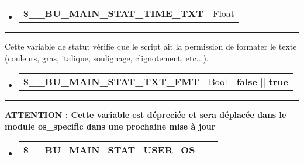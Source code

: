 \documentclass[a4paper,10pt]{article}
\begin{document}
\begin{justify}
     \begin{itemize}
        \item
        {
            \begin{tabular}{l|l}
                \textbf{\color{orange}\$\_\_BU\_MAIN\_STAT\_TIME\_TXT}  & Float\\[1\baselineskip]
            \end{tabular}
        }
    \end{itemize}
\end{justify}


\par\noindent\rule{\textwidth}{0.4pt}

\begin{justify}
    Cette variable de statut vérifie que le script ait la permission de formater le texte (couleurs, gras, italique, soulignage, clignotement, etc...).
\end{justify}

\begin{justify}
     \begin{itemize}
        \item
        {
            \begin{tabular}{l|l|l}
                \textbf{\color{orange}\$\_\_BU\_MAIN\_STAT\_TXT\_FMT}   & Bool & \textbf{false} || \textbf{true}\\[1\baselineskip]
            \end{tabular}
        }
    \end{itemize}
\end{justify}


\par\noindent\rule{\textwidth}{0.4pt}

\begin{justify}
\textbf{ATTENTION : Cette variable est dépreciée et sera déplacée dans le module \textbf{\color{lime}os\_specific} dans une prochaine mise à jour}
\end{justify}

\begin{justify}
     \begin{itemize}
        \item
        {
            \begin{tabular}{l|l|l}
                \textbf{\color{orange}\$\_\_BU\_MAIN\_STAT\_USER\_OS}   & &\\[1\baselineskip]
            \end{tabular}
        }
    \end{itemize}
\end{justify}
\end{document}
